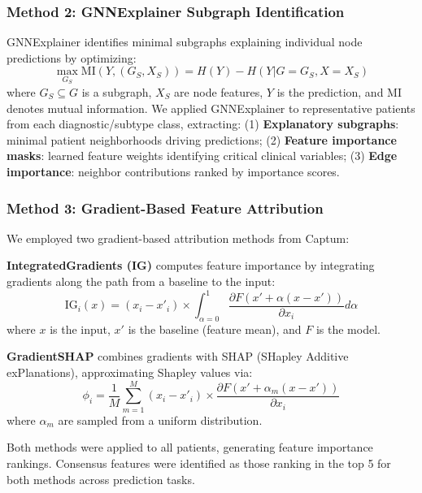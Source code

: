 \subsubsection{Method 2: GNNExplainer Subgraph Identification}

GNNExplainer\cite{ying2019gnnexplainer} identifies minimal subgraphs explaining individual node predictions by optimizing:
\begin{equation}
\max_{G_S} \text{MI}(Y, (G_S, X_S)) = H(Y) - H(Y | G = G_S, X = X_S)
\end{equation}
where $G_S \subseteq G$ is a subgraph, $X_S$ are node features, $Y$ is the prediction, and MI denotes mutual information. We applied GNNExplainer to representative patients from each diagnostic/subtype class, extracting: (1) \textbf{Explanatory subgraphs}: minimal patient neighborhoods driving predictions; (2) \textbf{Feature importance masks}: learned feature weights identifying critical clinical variables; (3) \textbf{Edge importance}: neighbor contributions ranked by importance scores.

\subsubsection{Method 3: Gradient-Based Feature Attribution}

We employed two gradient-based attribution methods from Captum\cite{kokhlikyan2020captum}:

\textbf{IntegratedGradients (IG)}\cite{sundararajan2017axiomatic} computes feature importance by integrating gradients along the path from a baseline to the input:
\begin{equation}
\text{IG}_i(x) = (x_i - x'_i) \times \int_{\alpha=0}^{1} \frac{\partial F(x' + \alpha(x - x'))}{\partial x_i} d\alpha
\end{equation}
where $x$ is the input, $x'$ is the baseline (feature mean), and $F$ is the model.

\textbf{GradientSHAP}\cite{lundberg2017unified} combines gradients with SHAP (SHapley Additive exPlanations), approximating Shapley values via:
\begin{equation}
\phi_i = \frac{1}{M} \sum_{m=1}^M (x_i - x'_i) \times \frac{\partial F(x' + \alpha_m(x - x'))}{\partial x_i}
\end{equation}
where $\alpha_m$ are sampled from a uniform distribution.

Both methods were applied to all patients, generating feature importance rankings. Consensus features were identified as those ranking in the top 5 for both methods across prediction tasks.

